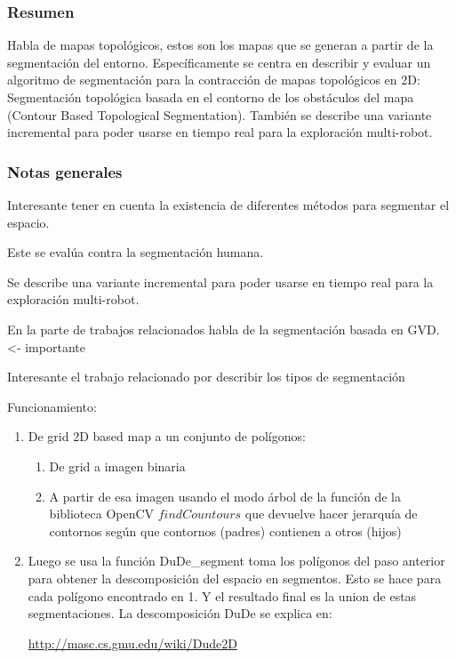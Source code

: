 \subsubsection{Resumen}
Habla de mapas topológicos, estos son los mapas que se generan a partir de la segmentación del entorno. 
Específicamente se centra en describir y evaluar un algoritmo de segmentación para la contracción de mapas topológicos en 2D: Segmentación topológica basada en el contorno de los obstáculos del mapa (Contour Based Topological Segmentation).
También se describe una variante incremental para poder usarse en tiempo real para la exploración multi-robot.

\subsubsection{Notas generales}
Interesante tener en cuenta la existencia de diferentes métodos para segmentar el espacio.

Este se evalúa contra la segmentación humana.

Se describe una variante incremental para poder usarse en tiempo real para la exploración multi-robot.

En la parte de trabajos relacionados habla de la segmentación basada en GVD. <- importante

Interesante el trabajo relacionado por describir los tipos de segmentación

Funcionamiento:
\begin{enumerate}
  \item De grid 2D based map a un conjunto de polígonos:
  \begin{enumerate}
     \item De grid a imagen binaria
     \item A partir de esa imagen usando el modo árbol de la función de la biblioteca OpenCV $findCountours$ que devuelve hacer jerarquía de contornos según que contornos (padres) contienen a otros (hijos)
  \end{enumerate}
\item Luego se usa la función DuDe\_segment toma los polígonos del paso anterior para obtener la descomposición del espacio en segmentos. Esto se hace para cada polígono encontrado en 1. Y el resultado final es la union de estas segmentaciones. La descomposición DuDe se explica en: 

  \url{http://masc.cs.gmu.edu/wiki/Dude2D}
\end{enumerate}

